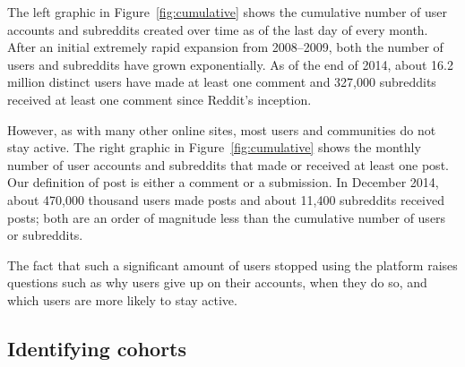The left graphic in Figure~\ref{fig:cumulative} shows the cumulative number of user accounts and subreddits created over time as of the last day of every month. 
After an initial extremely rapid expansion from 2008--2009, both the number of users and subreddits have grown exponentially.  As of the end of 2014, about 16.2 million distinct users have made at least one comment and 327,000 subreddits received at least one comment since Reddit's inception.

However, as with many other online sites, most users \cite{} and communities \cite{butler_kraut_paper} do not stay active. The right graphic in Figure~\ref{fig:cumulative} shows the monthly number of user accounts and subreddits that made or received at least one post. Our definition of post is either a comment or a submission. In December 2014, about 470,000 thousand users made posts and about 11,400 subreddits received posts; both are an order of magnitude less than the cumulative number of users or subreddits.  



The fact that such a significant amount of users stopped using the platform raises questions such as why users give up on their accounts, when they do so, and which users are more likely to stay active. 

\subsection{Identifying cohorts}
